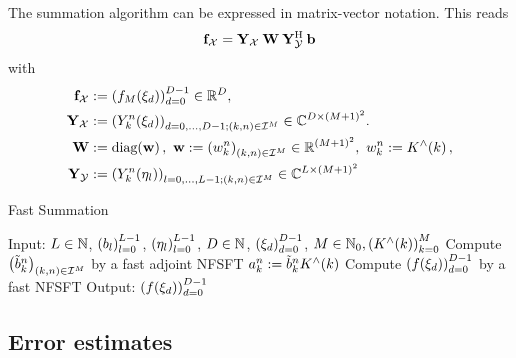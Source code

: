 \begin{remark}
	The summation algorithm can be expressed in matrix-vector notation. This reads
	\[
	  \mathbf{f}_{\mathcal{X}} = \mathbf{Y}_{\mathcal{X}} \: \mathbf{W} \:
	  \mathbf{Y}_{\mathcal{Y}}^{\text{\rm{H}}} \: \mathbf{b}
	\]
	with
	\begin{align}
	  \nonumber
	  \mathbf{f}_{\mathcal{X}} & := \left(f_{M}{\hspace{-0.4ex}}\left(\mathbf{\xi}_{d}\right)\right)_{d=0}^{D-1} \in \mathbb{R}^D,\\
	  \nonumber
	  \mathbf{Y}_{\mathcal{X}} & := \left(Y_k^n{\hspace{-0.4ex}}\left(\mathbf{\xi}_{d}\right)\right)_{d=0,\ldots,D-1; 
	  \left(k,n\right) \in \mathcal{I}^M} \in \mathbb{C}^{D \times \left(M+1\right)^2}. \\
	  \nonumber
	  \mathbf{W} & := \text{\rm{diag}}{\hspace{-0.4ex}}\left(\mathbf{w}\right),\ \mathbf{w} := \left(w_{k}^n\right)_{\left(k,n\right) \in 
	  \mathcal{I}^M} \in \mathbb{R}^{(M+1)^2},\ w_{k}^n := K^{\wedge}{\hspace{-0.4ex}}\left(k\right), \\
	  \nonumber
	  \mathbf{Y}_{\mathcal{Y}} & := \left(Y_k^n{\hspace{-0.4ex}}\left(\mathbf{\eta}_{l}\right)\right)_{l=0,\ldots,L-1;
	  \left(k,n\right) \in \mathcal{I}^M} \in \mathbb{C}^{L \times \left(M+1\right)^2}
	\end{align}
\end{remark}

\begin{algorithm}[tb]
  \caption{Fast Summation}
  \label{Applications:Algorithm:FastSummation}    
  \begin{algorithmic}
    \STATE  Input:  $L \in \mathbb{N}$, $\left(b_{l}\right)_{l=0}^{L-1}$, 
    $\left(\mathbf{\eta}_{l}\right)_{l=0}^{L-1}$, $D \in \mathbb{N}$, 
    $\left(\mathbf{\xi}_{d}\right)_{d=0}^{D-1}$, $M \in \mathbb{N}_{0}, 
    \left(K^{\wedge}{\hspace{-0.4ex}}\left(k\right)\right)_{k=0}^M$
    \STATE
    \STATE Compute $\left(\tilde{b}_{k}^n\right)_{\left(k,n\right) \in \mathcal{I}^M}$ 
    by a fast adjoint NFSFT
    \STATE 
        \STATE $a_{k}^n := \tilde{b}_{k}^n K^{\wedge}{\hspace{-0.4ex}}\left(k\right)$
      \ENDFOR
    \ENDFOR
    \STATE
    \STATE Compute $\left(f{\hspace{-0.4ex}}\left(\mathbf{\xi}_{d}\right)\right)_{d=0}^{D-1}$ by a fast NFSFT
    \STATE
    \STATE Output: $\left(f{\hspace{-0.4ex}}\left(\mathbf{\xi}_{d}\right)\right)_{d=0}^{D-1}$
\end{algorithmic}
\end{algorithm}

\subsection{Error estimates}


